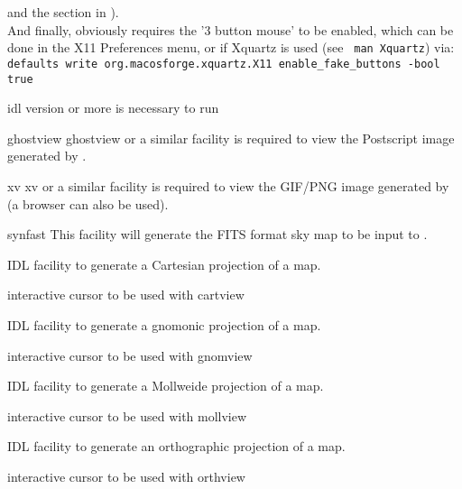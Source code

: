 \begin{codedescription}
{%
and the section  in ). \\
And finally, \thedocid{} obviously requires the '3 button mouse' to be enabled,
which can be done in the X11 Preferences menu, or if Xquartz is used (see {\tt
man Xquartz}) via:\\
{\footnotesize {\tt defaults write org.macosforge.xquartz.X11 enable\_fake\_buttons
-bool true}}
}
\end{codedescription}




\begin{related}
  \begin{sulist}{} %
  \item[idl] version \idlversion or more is necessary to run \thedocid
  \item[ghostview] ghostview or a similar facility is required to view
	  the Postscript image generated by \thedocid.
  \item[xv] xv or a similar facility is required to view the
            GIF/PNG image generated by \thedocid{}  (a browser can also 
            be used).
  \item[synfast] This \healpix facility will generate the FITS format 
            sky map to be input to \thedocid.
  \item[{\htmlref{cartview}{idl:cartview}}] 
	IDL facility to generate a Cartesian projection of
  	a \healpix map.
  \item[{\htmlref{cartcursor}{idl:cartcursor}}] 
	interactive cursor to be used with cartview
  \item[{\htmlref{gnomview}{idl:gnomview}}] 
	IDL facility to generate a gnomonic projection of
  	a \healpix map.
  \item[{\htmlref{gnomcursor}{idl:gnomcursor}}] 
	interactive cursor to be used with gnomview
  \item[{\htmlref{mollview}{idl:mollview}}] 
	IDL facility to generate a Mollweide projection of
  	a \healpix map.
  \item[{\htmlref{mollcursor}{idl:mollcursor}}] interactive cursor to be used with mollview
  \item[{\htmlref{orthview}{idl:orthview}}] 
	IDL facility to generate an orthographic projection of
  	a \healpix map.
  \item[{\htmlref{orthcursor}{idl:orthcursor}}] 
	interactive cursor to be used with orthview
  \end{sulist}
\end{related}

